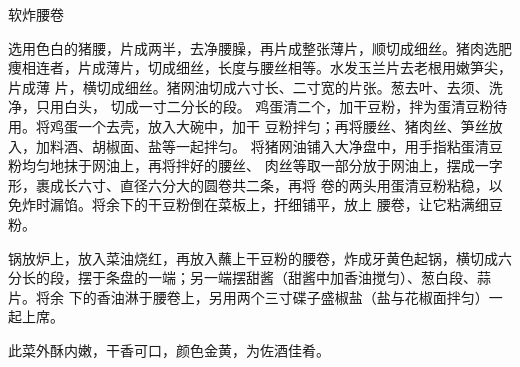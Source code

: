 \begin{recipe}{软炸腰卷}

\ingredients


\preparation

\step 选用色白的猪腰，片成两半，去净腰臊，再片成整张薄片，顺切成细丝。猪肉选肥
痩相连者，片成薄片，切成细丝，长度与腰丝相等。水发玉兰片去老根用嫩笋尖，片成薄
片，横切成细丝。猪网油切成六寸长、二寸宽的片张。葱去叶、去须、洗净，只用白头，
切成一寸二分长的段。
\step 鸡蛋清二个，加干豆粉，拌为蛋清豆粉待用。将鸡蛋一个去壳，放入大碗中，加干
豆粉拌匀；再将腰丝、猪肉丝、笋丝放入，加料酒、胡椒面、盐等一起拌匀。
\step 将猪网油铺入大净盘中，用手指粘蛋清豆粉均匀地抹于网油上，再将拌好的腰丝、
肉丝等取一部分放于网油上，摆成一字形，裹成长六寸、直径六分大的圆卷共二条，再将
卷的两头用蛋清豆粉粘稳，以免炸时漏馅。将余下的干豆粉倒在菜板上，扞细铺平，放上
腰卷，让它粘满细豆粉。

\step 锅放炉上，放入菜油烧红，再放入蘸上干豆粉的腰卷，炸成牙黄色起锅，横切成六
分长的段，摆于条盘的一端；另一端摆甜酱（甜酱中加香油搅匀）、葱白段、蒜片。将余
下的香油淋于腰卷上，另用两个三寸碟子盛椒盐（盐与花椒面拌匀）一起上席。

\features

此菜外酥内嫩，干香可口，颜色金黄，为佐酒佳肴。

\end{recipe}

